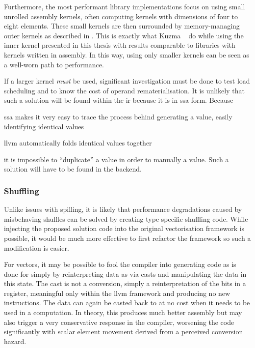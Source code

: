 \documentclass[\main/thesis.tex]{subfiles}
\begin{document}
Furthermore, the most performant library implementations focus on using small unrolled assembly kernels, often computing kernels with dimensions of four to eight elements.
These small kernels are then surrounded by memory-managing outer kernels as described in .
This is exactly what Kuzma \etal~\autocite{kuzma2021fast} do while using the inner kernel presented in this thesis with results comparable to libraries with kernels written in assembly.
In this way, using only smaller kernels can be seen as a well-worn path to performance.

If a larger kernel \emph{must} be used, significant investigation must be done to test load scheduling and to know the cost of operand \gls{rematerialisation}.
It is unlikely that such a solution will be found within the \gls{ir} because it is in \gls{ssa} form.
Because
\begin{enumerate*}[itemjoin={{; }}, itemjoin*={{; and }}, label=(\arabic*), after={,}]
  \item \gls{ssa} makes it very easy to trace the process behind generating a value, easily identifying identical values
  \item \gls{llvm} automatically folds identical values together
\end{enumerate*}
it is impossible to ``duplicate'' a value in order to manually  a value.
Such a solution will have to be found in the backend.

\subsubsection{Shuffling}
Unlike issues with spilling, it is likely that performance degradations caused by misbehaving shuffles can be solved by creating type specific shuffling code.
While injecting the proposed solution code into the original vectorisation framework is possible, it would be much more effective to first refactor the framework so such a modification is easier.

For  vectors, it may be possible to fool the compiler into generating code as is done for  simply by reinterpreting data as  via casts and manipulating the data in this state.
The cast is not a conversion, simply a reinterpretation of the bits in a register, meaningful only within the \gls{llvm} framework and producing no new instructions.
The data can again be casted back to  at no cost when it needs to be used in a computation.
In theory, this produces much better assembly but may also trigger a very conservative response in the compiler, worsening the code significantly with scalar element movement derived from a perceived conversion hazard.
\end{document}
